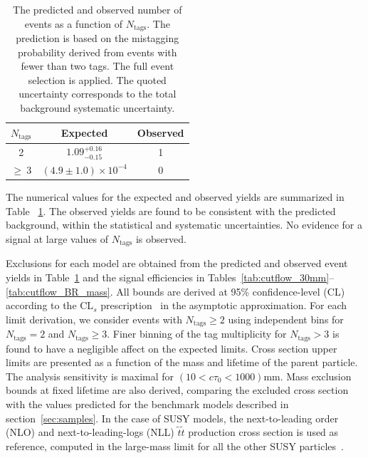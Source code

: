 \begin{table}[tb]
  \caption{The predicted and observed number of events as a function
    of $N_{\textrm{tags}}$. The prediction is based on the
    mistagging probability derived from events with fewer than two tags. 
    The full event selection is applied. The quoted uncertainty
    corresponds to the total background systematic uncertainty.\label{tab:result}}
\begin{center}
\begin{tabular}{ccc}
\textbf{$N_{\textrm{tags}}$} & \textbf{Expected} & \textbf{Observed} \\
\hline
2 & $1.09^{+0.16}_{-0.15}$ & 1  \\
$\geq~3$ & $(4.9 \pm 1.0) \times 10^{-4}$ & 0 \\
\end{tabular}
\end{center}
\end{table}

The numerical values for the expected and observed yields are
summarized in Table ~\ref{tab:result}.  The observed yields are found to
be consistent with the predicted background, within the statistical
and systematic uncertainties. No evidence for a signal at large values
of $N_{\textrm{tags}}$ is observed. 

Exclusions for each model are obtained from the predicted and observed
event yields in Table~\ref{tab:result} and the signal efficiencies in
Tables~\ref{tab:cutflow_30mm}--\ref{tab:cutflow_BR_mass}.  All bounds
are derived at 95\% confidence-level (CL) according to the CL$_{s}$
prescription~\cite{CLs1,CLs2,LHCCLs} in the asymptotic approximation.
For each limit derivation, we consider events with $N_{\textrm{tags}}\geq 2$ 
using independent bins for $N_{\textrm{tags}}=2$ and
$N_{\textrm{tags}}\geq 3$. Finer binning of the tag multiplicity for $N_{\textrm{tags}}>3$
is found to have a negligible affect on the expected limits. 
Cross section upper limits are
 presented as a function of the
mass and lifetime of the parent particle.  The analysis sensitivity is
maximal for $(10 < c\tau_0 < 1000)$mm. Mass exclusion bounds at
fixed lifetime are also derived, comparing the excluded cross section
with the values predicted for the benchmark models described in
section~\ref{sec:samples}. In the case of SUSY models, the
next-to-leading order (NLO) and next-to-leading-logs (NLL)
$\tilde{t}\tilde{t}$ production cross section is used as reference,
computed in the large-mass limit for all the other SUSY
particles~\cite{NLONLL1,NLONLL2,NLONLL3,NLONLL4,NLONLL5,NLONLLerr}.

